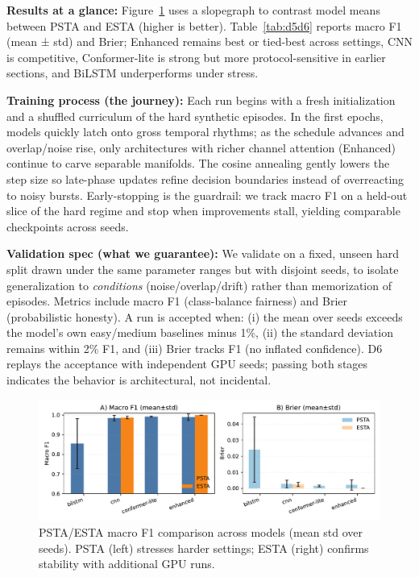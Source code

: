 \documentclass[journal]{IEEEtran}
\begin{document}
\textbf{Results at a glance:} Figure~\ref{fig:d5d6_results} uses a slopegraph to contrast model means between PSTA and ESTA (higher is better). Table~\ref{tab:d5d6} reports macro F1 (mean ± std) and Brier; Enhanced remains best or tied-best across settings, CNN is competitive, Conformer-lite is strong but more protocol-sensitive in earlier sections, and BiLSTM underperforms under stress.

\textbf{Training process (the journey):} Each run begins with a fresh initialization and a shuffled curriculum of the hard synthetic episodes. In the first epochs, models quickly latch onto gross temporal rhythms; as the schedule advances and overlap/noise rise, only architectures with richer channel attention (Enhanced) continue to carve separable manifolds. The cosine annealing gently lowers the step size so late-phase updates refine decision boundaries instead of overreacting to noisy bursts. Early-stopping is the guardrail: we track macro F1 on a held-out slice of the hard regime and stop when improvements stall, yielding comparable checkpoints across seeds.

\textbf{Validation spec (what we guarantee):} We validate on a fixed, unseen hard split drawn under the same parameter ranges but with disjoint seeds, to isolate generalization to \emph{conditions} (noise/overlap/drift) rather than memorization of episodes. Metrics include macro F1 (class-balance fairness) and Brier (probabilistic honesty). A run is accepted when: (i) the mean over seeds exceeds the model's own easy/medium baselines minus 1\%, (ii) the standard deviation remains within 2\% F1, and (iii) Brier tracks F1 (no inflated confidence). D6 replays the acceptance with independent GPU seeds; passing both stages indicates the behavior is architectural, not incidental.

\begin{figure}[ht]
\centering
\includegraphics[width=\columnwidth]{figures/fig8_d56_composite.pdf}
\caption{PSTA/ESTA macro F1 comparison across models (mean \textpm{} std over seeds). PSTA (left) stresses harder settings; ESTA (right) confirms stability with additional GPU runs.}
\label{fig:d5d6_results}
\end{figure}
\end{document}
